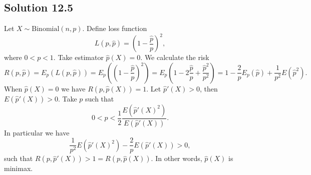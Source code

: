 \subsection*{Solution 12.5}

Let $X \sim \mathrm{Binomial}(n, p)$.
Define loss function
\begin{equation*}
    L(p, \hat{p}) = \left(1 - \frac{\hat{p}}{p}\right)^2,
\end{equation*}
where $0 < p < 1$.
Take estimator $\hat{p}(X) = 0$.
We calculate the risk
\begin{equation*}
    R(p, \hat{p}) = E_{p}(L(p, \hat{p}))
        = E_p\left(\left(1 - \frac{\hat{p}}{p}\right)^2\right)
        = E_p\left(1 - 2\frac{\hat{p}}{p} + \frac{\hat{p}^2}{p^2}\right)
        = 1 - \frac{2}{p} E_p(\hat{p}) + \frac{1}{p^2} E(\hat{p}^2).
\end{equation*}
When $\hat{p}(X) = 0$ we have $R(p, \hat{p}(X)) = 1$.
Let $\hat{p}'(X) > 0$, then $E(\hat{p}'(X)) > 0$.
Take $p$ such that
\begin{equation*}
    0 < p < \frac{1}{2} \frac{E(\hat{p}'(X)^2)}{E(\hat{p}'(X))}.
\end{equation*}
In particular we have
\begin{equation*}
    \frac{1}{p^2} E(\hat{p}'(X)^2) - \frac{2}{p} E(\hat{p}'(X)) > 0,
\end{equation*}
such that $R(p, \hat{p}'(X)) > 1 = R(p, \hat{p}(X))$.
In other words, $\hat{p}(X)$ is minimax.
